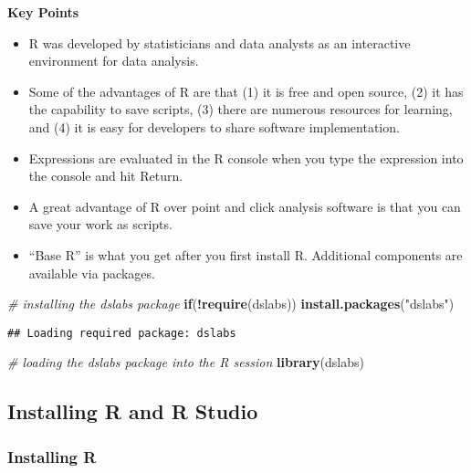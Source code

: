 \documentclass[
]{article}
\newenvironment{Shaded}{\begin{snugshade}}{\end{snugshade}}
\newcommand{\CommentTok}[1]{\textcolor[rgb]{0.56,0.35,0.01}{\textit{#1}}}
\newcommand{\ControlFlowTok}[1]{\textcolor[rgb]{0.13,0.29,0.53}{\textbf{#1}}}
\newcommand{\KeywordTok}[1]{\textcolor[rgb]{0.13,0.29,0.53}{\textbf{#1}}}
\newcommand{\NormalTok}[1]{#1}
\newcommand{\OperatorTok}[1]{\textcolor[rgb]{0.81,0.36,0.00}{\textbf{#1}}}
\newcommand{\StringTok}[1]{\textcolor[rgb]{0.31,0.60,0.02}{#1}}
\providecommand{\tightlist}{%
  \setlength{\itemsep}{0pt}\setlength{\parskip}{0pt}}
\begin{document}
\textbf{Key Points}

\begin{itemize}
\tightlist
\item
  R was developed by statisticians and data analysts as an interactive
  environment for data analysis.
\item
  Some of the advantages of R are that (1) it is free and open source,
  (2) it has the capability to save scripts, (3) there are numerous
  resources for learning, and (4) it is easy for developers to share
  software implementation.
\item
  Expressions are evaluated in the R console when you type the
  expression into the console and hit Return.
\item
  A great advantage of R over point and click analysis software is that
  you can save your work as scripts.
\item
  ``Base R'' is what you get after you first install R. Additional
  components are available via packages.
\end{itemize}

\begin{Shaded}
\begin{Highlighting}[]
\CommentTok{# installing the dslabs package}
\ControlFlowTok{if}\NormalTok{(}\OperatorTok{!}\KeywordTok{require}\NormalTok{(dslabs)) }\KeywordTok{install.packages}\NormalTok{(}\StringTok{"dslabs"}\NormalTok{)}
\end{Highlighting}
\end{Shaded}

\begin{verbatim}
## Loading required package: dslabs
\end{verbatim}

\begin{Shaded}
\begin{Highlighting}[]
\CommentTok{# loading the dslabs package into the R session}
\KeywordTok{library}\NormalTok{(dslabs)}
\end{Highlighting}
\end{Shaded}

\hypertarget{installing-r-and-r-studio}{%
\subsection{Installing R and R Studio}\label{installing-r-and-r-studio}}

\hypertarget{installing-r}{%
\subsubsection{Installing R}\label{installing-r}}
\end{document}
